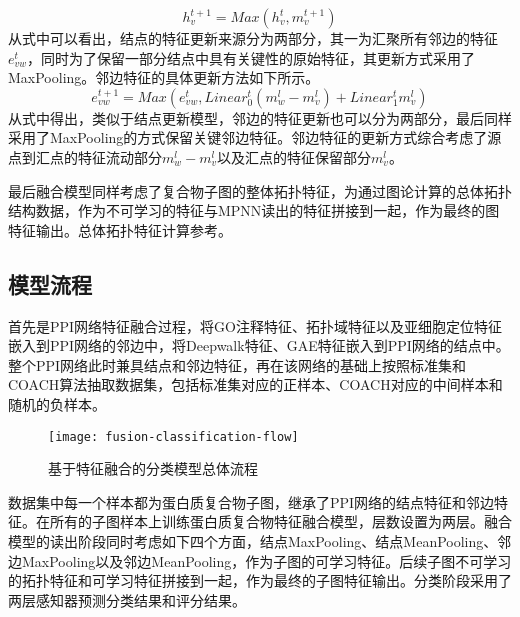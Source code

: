 \begin{equation}
    \label{equ:MineMPNNReadout}
    h_v^{t+1} = Max(h_v^t,m_v^{t+1})
\end{equation}
从式中可以看出，结点的特征更新来源分为两部分，其一为汇聚所有邻边的特征$e_{vw}^t$，同时为了保留一部分结点中具有关键性的原始特征，其更新方式采用了MaxPooling。邻边特征的具体更新方法如下所示。
\begin{equation}
    \label{equ:MineMPNNedge}
    e_{vw}^{t+1} = Max(e_{vw}^t,Linear_0^t(m_w^{l} - m_v^{l}) + Linear_1^t m_v^{l})
\end{equation}
从式中得出，类似于结点更新模型，邻边的特征更新也可以分为两部分，最后同样采用了MaxPooling的方式保留关键邻边特征。邻边特征的更新方式综合考虑了源点到汇点的特征流动部分$m_w^{l} - m_v^{l}$以及汇点的特征保留部分$m_v^{l}$。


最后融合模型同样考虑了复合物子图的整体拓扑特征，为通过图论计算的总体拓扑结构数据，作为不可学习的特征与MPNN读出的特征拼接到一起，作为最终的图特征输出。总体拓扑特征计算参考\cite{yu_predicting_2014}。

\subsection{模型流程}
\label{subsection:fusion:Modelflow}
首先是PPI网络特征融合过程，将GO注释特征、拓扑域特征以及亚细胞定位特征嵌入到PPI网络的邻边中，将Deepwalk特征、GAE特征嵌入到PPI网络的结点中。整个PPI网络此时兼具结点和邻边特征，再在该网络的基础上按照标准集和COACH算法抽取数据集，包括标准集对应的正样本、COACH对应的中间样本和随机的负样本。
\begin{figure}[htbp]
    \centering
    \texttt{[image: fusion-classification-flow]}
    \caption{基于特征融合的分类模型总体流程}
    \label{fig:fusion-classification-flow}
\end{figure}

数据集中每一个样本都为蛋白质复合物子图，继承了PPI网络的结点特征和邻边特征。在所有的子图样本上训练蛋白质复合物特征融合模型，层数设置为两层。融合模型的读出阶段同时考虑如下四个方面，结点MaxPooling、结点MeanPooling、邻边MaxPooling以及邻边MeanPooling，作为子图的可学习特征。后续子图不可学习的拓扑特征和可学习特征拼接到一起，作为最终的子图特征输出。分类阶段采用了两层感知器预测分类结果和评分结果。


